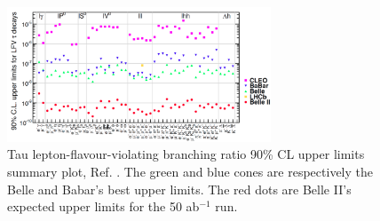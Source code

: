 \begin{figure}[!h]
\centering
\includegraphics[width =0.7\textwidth]{figures/png/Screenshot_20240319_134052.png}
\caption[Tau lepton-flavour-violating branching ratio upper limits.]{Tau lepton-flavour-violating branching ratio 90\% CL upper limits summary plot, Ref. \cite{universe4100101}. The green and blue cones 
are respectively the Belle and Babar's best upper limits. The red dots are Belle II's expected upper limits for the 50 ab$^{-1}$ run.}
\label{fig:tauchannel}
\end{figure}


